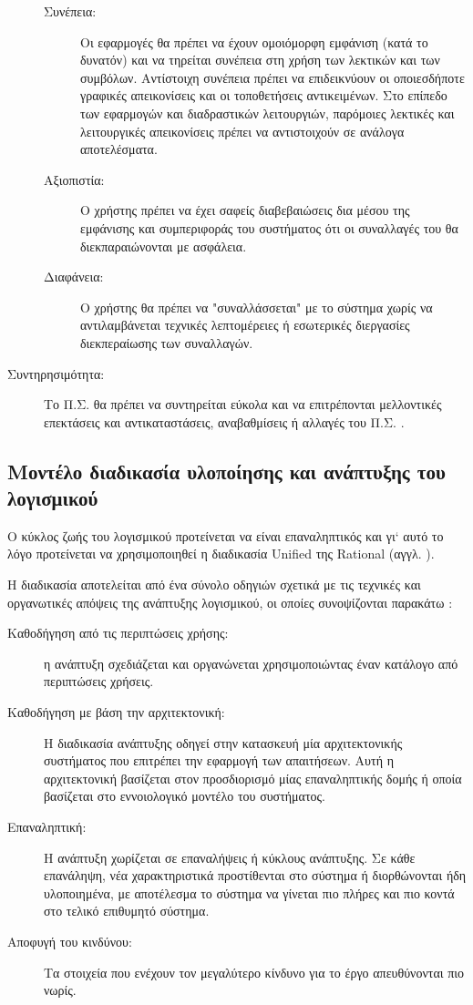 \documentclass{assignment}
\begin{document}
\begin{description}
\begin{description}
	\item[Συνέπεια:] Οι εφαρμογές θα πρέπει να έχουν ομοιόμορφη εμφάνιση (κατά το δυνατόν) και να τηρείται συνέπεια στη χρήση των λεκτικών και των συμβόλων. Αντίστοιχη συνέπεια πρέπει να επιδεικνύουν οι οποιεσδήποτε γραφικές απεικονίσεις και οι τοποθετήσεις αντικειμένων. Στο επίπεδο των εφαρμογών και διαδραστικών λειτουργιών, παρόμοιες λεκτικές και λειτουργικές απεικονίσεις πρέπει να αντιστοιχούν σε ανάλογα αποτελέσματα.

	\item [Αξιοπιστία:] Ο χρήστης πρέπει να έχει σαφείς διαβεβαιώσεις δια μέσου της εμφάνισης και συμπεριφοράς του συστήματος ότι οι συναλλαγές του θα διεκπαραιώνονται με ασφάλεια.

	\item[Διαφάνεια:] Ο χρήστης θα πρέπει να "συναλλάσσεται" με το σύστημα χωρίς να αντιλαμβάνεται τεχνικές λεπτομέρειες ή εσωτερικές διεργασίες διεκπεραίωσης των συναλλαγών.
\end{description}

\item[Συντηρησιμότητα:] Το Π.Σ. θα πρέπει να συντηρείται εύκολα και να επιτρέπονται μελλοντικές επεκτάσεις και αντικαταστάσεις, αναβαθμίσεις ή αλλαγές του Π.Σ. .

\end{description}


\subsection{Μοντέλο διαδικασία υλοποίησης και ανάπτυξης του λογισμικού}

Ο κύκλος ζωής του λογισμικού προτείνεται να είναι επαναληπτικός \cite{virvou_uml} και γι` αυτό το λόγο προτείνεται να χρησιμοποιηθεί η διαδικασία Unified της Rational (αγγλ. ).

Η διαδικασία  αποτελείται από ένα σύνολο οδηγιών σχετικά με τις τεχνικές και οργανωτικές απόψεις της ανάπτυξης λογισμικού, οι οποίες συνοψίζονται παρακάτω \cite{wazlawick2014object}:

\begin{description}
\item[Καθοδήγηση από τις περιπτώσεις χρήσης:] η ανάπτυξη σχεδιάζεται και οργανώνεται χρησιμοποιώντας έναν κατάλογο από περιπτώσεις χρήσεις. 
\item[Καθοδήγηση με βάση την αρχιτεκτονική:] Η διαδικασία ανάπτυξης οδηγεί στην κατασκευή μία αρχιτεκτονικής συστήματος που επιτρέπει την εφαρμογή των απαιτήσεων. Αυτή η αρχιτεκτονική βασίζεται στον προσδιορισμό μίας επαναληπτικής δομής ή οποία βασίζεται στο εννοιολογικό μοντέλο του συστήματος.
\item[Επαναληπτική: ] Η ανάπτυξη χωρίζεται σε επαναλήψεις ή κύκλους ανάπτυξης. Σε κάθε επανάληψη, νέα χαρακτηριστικά προστίθενται στο σύστημα ή διορθώνονται ήδη υλοποιημένα, με αποτέλεσμα το σύστημα να γίνεται πιο πλήρες και πιο κοντά στο τελικό επιθυμητό σύστημα.
\item[Αποφυγή του κινδύνου: ] Τα στοιχεία που ενέχουν τον μεγαλύτερο κίνδυνο για το έργο απευθύνονται πιο νωρίς.  
\end{description}
\end{document}
